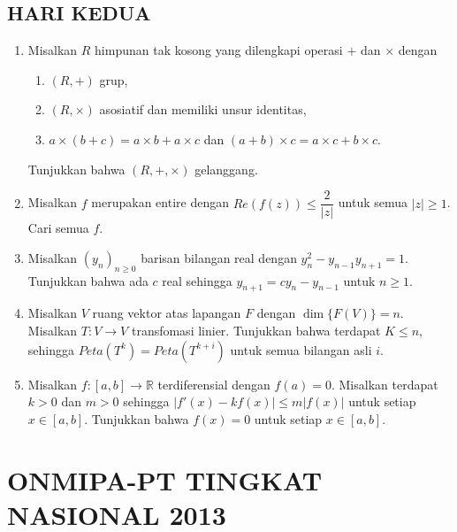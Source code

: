 \documentclass[12pt,twoside]{article}
\begin{document}
\subsection{HARI KEDUA}
\begin{enumerate}
    \item Misalkan $R$ himpunan tak kosong yang dilengkapi operasi $+$ dan $\times$ dengan
          \begin{enumerate}
              \item [(a)] $(R,+)$ grup,
              \item[(b)] $(R,\times)$ asosiatif dan memiliki unsur identitas,
              \item[(c)] $a\times(b+c)=a\times b+ a\times c$ dan $(a+b)\times c=a\times c+b\times c$.
          \end{enumerate}
          Tunjukkan bahwa $(R,+,\times)$ gelanggang.

    \item Misalkan $f$ merupakan entire dengan $Re(f(z))\leq \dfrac{2}{|z|}$ untuk semua $|z|\geq 1$. Cari semua $f$.

    \item Misalkan $(y_n)_{n\geq 0}$ barisan bilangan real dengan $y_n^2-y_{n-1}y_{n+1}=1$. Tunjukkan bahwa ada $c$ real sehingga $y_{n+1}=cy_n-y_{n-1}$ untuk $n\geq 1$.

    \item Misalkan $V$ ruang vektor atas lapangan  $F$ dengan $\dim\{F(V)\}=n$. Misalkan $T:V\to V$ transfomasi linier. Tunjukkan bahwa terdapat $K\leq n,$ sehingga $Peta(T^k)=Peta(T^{k+i})$ untuk semua bilangan asli $i$.

    \item Misalkan $f:[a,b]\to \mathbb{R}$ terdiferensial dengan $f(a)=0$. Misalkan terdapat $k>0$ dan $m>0$ sehingga $|f'(x)-kf(x)|\leq m|f(x)|$ untuk setiap $x\in[a,b]$. Tunjukkan bahwa $f(x)=0$ untuk setiap $x\in[a,b]$.
\end{enumerate}
\newpage
{}
\section{ONMIPA-PT TINGKAT NASIONAL 2013}
\end{document}
